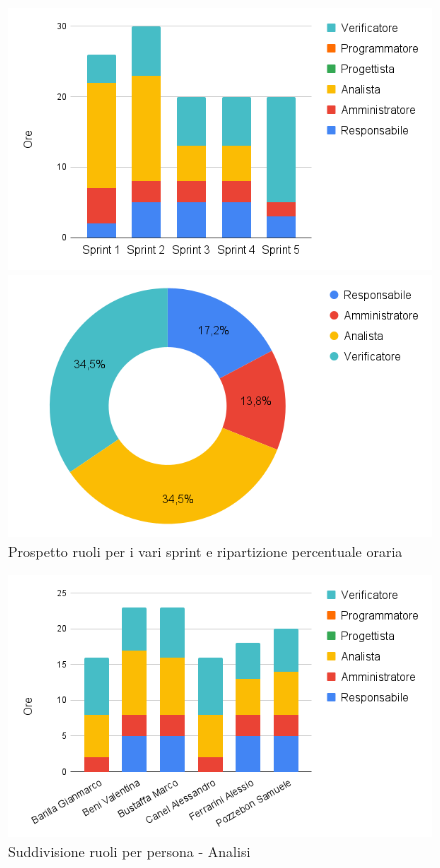 \begin{figure}[h!]
	\centering
	\begin{minipage}[c]{0.3\textwidth}
    	\includegraphics[scale=0.43]{../../assets/Diagrammi_Excel/sprint_analisi.png}
	\end{minipage}
\hfill
	\begin{minipage}[c]{0.45\textwidth}
		\includegraphics[scale=0.37]{../../assets/Diagrammi_Excel/tortanalisi.png}
	\end{minipage}
	\caption{Prospetto ruoli per i vari sprint e ripartizione percentuale oraria}
\end{figure}

\begin{figure}[h!]
	\centering
	\includegraphics[scale=0.47]{../../assets/Diagrammi_Excel/person_analisi.png}
	\caption{Suddivisione ruoli per persona - Analisi}
\end{figure}


